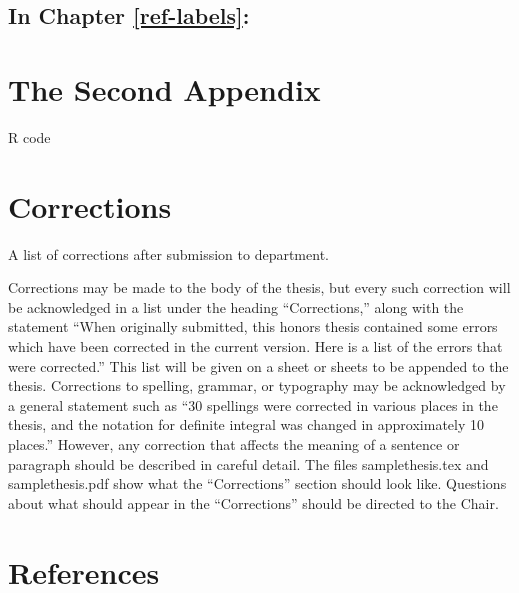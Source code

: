 \documentclass[12pt, twoside]{amherstthesis}
\begin{document}
\hypertarget{in-chapter-refref-labels}{%
\section{In Chapter \ref{ref-labels}:}\label{in-chapter-refref-labels}}

\hypertarget{the-second-appendix}{%
\chapter{The Second Appendix}\label{the-second-appendix}}

R code

\hypertarget{corrections}{%
\chapter*{Corrections}\label{corrections}}

A list of corrections after submission to department.

Corrections may be made to the body of the thesis, but every such correction will be acknowledged in a list under the heading ``Corrections,'' along with the statement ``When originally submitted, this honors thesis contained some errors which have been corrected in the current version. Here is a list of the errors that were corrected.'' This list will be given on a sheet or sheets to be appended to the thesis. Corrections to spelling, grammar, or typography may be acknowledged by a general statement such as ``30 spellings were corrected in various places in the thesis, and the notation for definite integral was changed in approximately 10 places.'' However, any correction that affects the meaning of a sentence or paragraph should be described in careful detail. The files samplethesis.tex and samplethesis.pdf show what the ``Corrections'' section should look like. Questions about what should appear in the ``Corrections'' should be directed to the Chair.

\backmatter

\hypertarget{references}{%
\chapter*{References}\label{references}}

\noindent

\setlength{\parindent}{-0.20in}
\setlength{\leftskip}{0.20in}
\setlength{\parskip}{8pt}
\end{document}
